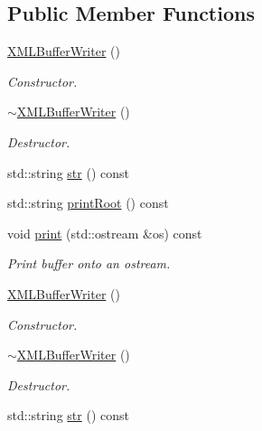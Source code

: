 \subsection*{Public Member Functions}
\begin{DoxyCompactItemize}
\item 
\mbox{\hyperlink{classADATXML_1_1XMLBufferWriter_a237df70a2c5eaf8bcc14c51ea9d4ef5a}{X\+M\+L\+Buffer\+Writer}} ()
\begin{DoxyCompactList}\small\item\em Constructor. \end{DoxyCompactList}\item 
\mbox{\hyperlink{classADATXML_1_1XMLBufferWriter_a211892bc8276e281c03174ff74f94c0f}{$\sim$\+X\+M\+L\+Buffer\+Writer}} ()
\begin{DoxyCompactList}\small\item\em Destructor. \end{DoxyCompactList}\item 
std\+::string \mbox{\hyperlink{classADATXML_1_1XMLBufferWriter_a3980a9a10a3616f76b7403c69c4006f0}{str}} () const
\item 
std\+::string \mbox{\hyperlink{classADATXML_1_1XMLBufferWriter_a323aadabc642e99d4de3f08706d918d0}{print\+Root}} () const
\item 
void \mbox{\hyperlink{classADATXML_1_1XMLBufferWriter_a1256054ea792711a5ff2807afd4f6404}{print}} (std\+::ostream \&os) const
\begin{DoxyCompactList}\small\item\em Print buffer onto an ostream. \end{DoxyCompactList}\item 
\mbox{\hyperlink{classADATXML_1_1XMLBufferWriter_a237df70a2c5eaf8bcc14c51ea9d4ef5a}{X\+M\+L\+Buffer\+Writer}} ()
\begin{DoxyCompactList}\small\item\em Constructor. \end{DoxyCompactList}\item 
\mbox{\hyperlink{classADATXML_1_1XMLBufferWriter_a211892bc8276e281c03174ff74f94c0f}{$\sim$\+X\+M\+L\+Buffer\+Writer}} ()
\begin{DoxyCompactList}\small\item\em Destructor. \end{DoxyCompactList}\item 
std\+::string \mbox{\hyperlink{classADATXML_1_1XMLBufferWriter_a12021e9b23e88cb760f4b64a8e845e5e}{str}} () const
\item 

\end{DoxyCompactItemize}

